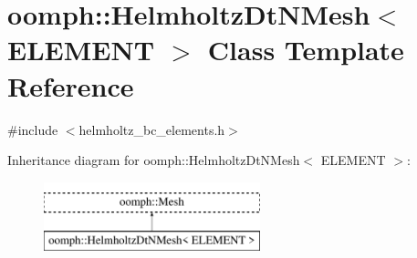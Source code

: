 \hypertarget{classoomph_1_1HelmholtzDtNMesh}{}\section{oomph\+:\+:Helmholtz\+Dt\+N\+Mesh$<$ E\+L\+E\+M\+E\+NT $>$ Class Template Reference}
\label{classoomph_1_1HelmholtzDtNMesh}


{\ttfamily \#include $<$helmholtz\+\_\+bc\+\_\+elements.\+h$>$}

Inheritance diagram for oomph\+:\+:Helmholtz\+Dt\+N\+Mesh$<$ E\+L\+E\+M\+E\+NT $>$\+:\begin{figure}[H]
\begin{center}
\leavevmode
\includegraphics[height=2.000000cm]{classoomph_1_1HelmholtzDtNMesh}
\end{center}
\end{figure}
